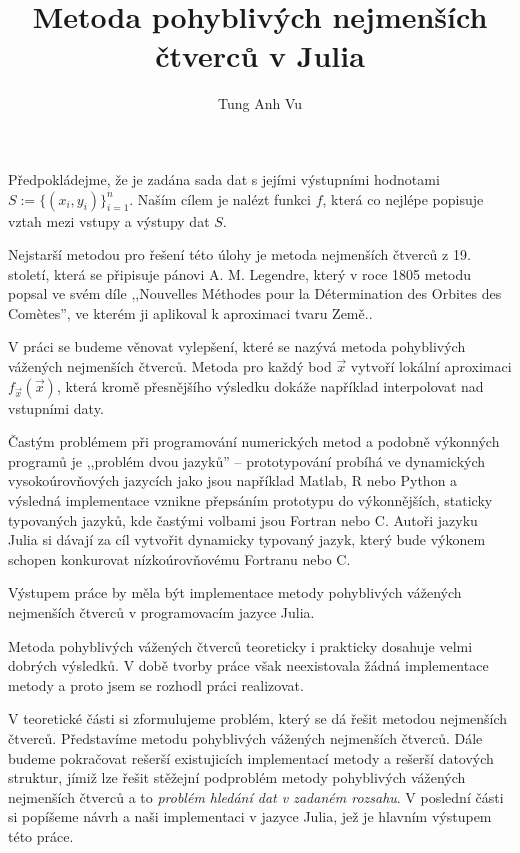 \documentclass[thesis=B,czech]{FITthesis}[2012/06/26]
\title{Metoda pohyblivých nejmenších čtverců v Julia}
\author{Tung Anh Vu} %
\theoremstyle{newthm}
\begin{document}

\begin{introduction}
Předpokládejme, že je zadána sada dat s jejími výstupními hodnotami $S := \{(x_i, y_i)\}_{i = 1}^n$. Naším cílem je nalézt funkci $f$, která co nejlépe popisuje vztah mezi vstupy a výstupy dat $S$.

Nejstarší metodou pro řešení této úlohy je metoda nejmenších čtverců z 19. století, která se připisuje pánovi A. M. Legendre, který v roce 1805 metodu popsal ve svém díle ,,Nouvelles Méthodes pour la Détermination des Orbites des Com\`etes'', ve kterém ji aplikoval k aproximaci tvaru Země.\cite[s.~12--14]{history_of_statistics}.

V práci se budeme věnovat vylepšení, které se nazývá metoda pohyblivých vážených nejmenších čtverců. Metoda pro každý bod $\vec{x}$ vytvoří lokální aproximaci $f_{\vec{x}}(\vec{x})$, která kromě přesnějšího výsledku dokáže například interpolovat nad vstupními daty.

Častým problémem při programování numerických metod a podobně výkonných programů je ,,problém dvou jazyků'' -- prototypování probíhá ve dynamických vysokoúrovňových jazycích jako jsou například Matlab, R nebo Python a výsledná implementace vznikne přepsáním prototypu do výkonnějších, staticky typovaných jazyků, kde častými volbami jsou Fortran nebo C. Autoři jazyku Julia si dávají za cíl vytvořit dynamicky typovaný jazyk, který bude výkonem schopen konkurovat nízkoúrovňovému Fortranu nebo C.\cite{julia}

Výstupem práce by měla být implementace metody pohyblivých vážených nejmenších čtverců v programovacím jazyce Julia.

Metoda pohyblivých vážených čtverců teoreticky i prakticky dosahuje velmi dobrých výsledků.\cite{surfaces-mwls} V době tvorby práce však neexistovala žádná implementace metody a proto jsem se rozhodl práci realizovat.

V teoretické části si zformulujeme problém, který se dá řešit metodou nejmenších čtverců. Představíme metodu pohyblivých vážených nejmenších čtverců. Dále budeme pokračovat rešerší existujicích implementací metody a rešerší datových struktur, jímiž lze řešit stěžejní podproblém metody pohyblivých vážených nejmenších čtverců a to \textit{problém hledání dat v zadaném rozsahu}. V poslední části si popíšeme návrh a naši implementaci v jazyce Julia, jež je hlavním výstupem této práce.
\end{introduction}
\end{document}
